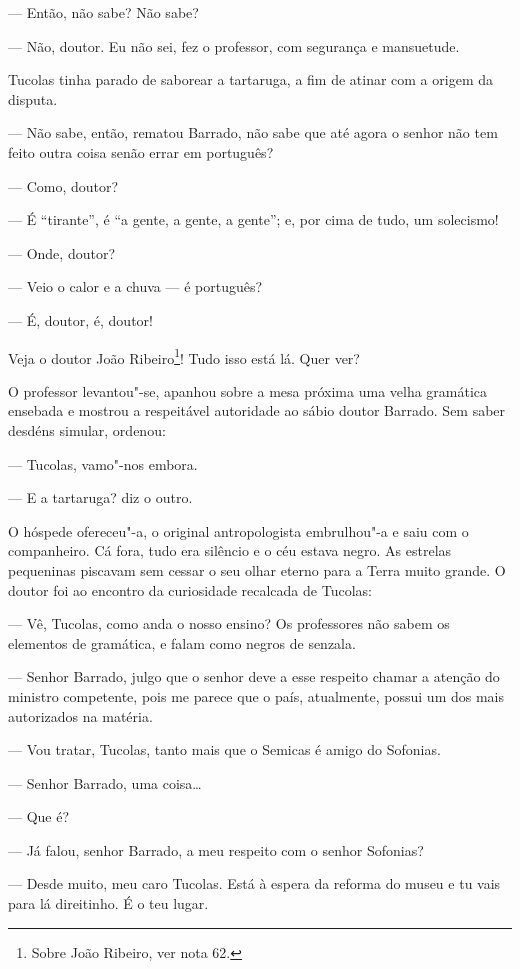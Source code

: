 --- Então, não sabe? Não sabe?

--- Não, doutor. Eu não sei, fez o professor, com segurança e
mansuetude.

Tucolas tinha parado de saborear a tartaruga, a fim de atinar com a
origem da disputa.

--- Não sabe, então, rematou Barrado, não sabe que até agora o senhor
não tem feito outra coisa senão errar em português?

--- Como, doutor?

--- É ``tirante'', é ``a gente, a gente, a gente''; e, por cima de tudo,
um solecismo!

--- Onde, doutor?

--- Veio o calor e a chuva --- é português?

--- É, doutor, é, doutor!

Veja o doutor João Ribeiro\footnote{Sobre João Ribeiro, ver nota 62.}!
Tudo isso está lá. Quer ver?

O professor levantou"-se, apanhou sobre a mesa próxima uma velha
gramática ensebada e mostrou a respeitável autoridade ao sábio doutor
Barrado. Sem saber desdéns simular, ordenou:

--- Tucolas, vamo"-nos embora.

--- E a tartaruga? diz o outro.

O hóspede ofereceu"-a, o original antropologista embrulhou"-a e saiu com o
companheiro. Cá fora, tudo era silêncio e o céu estava negro. As
estrelas pequeninas piscavam sem cessar o seu olhar eterno para a Terra
muito grande. O doutor foi ao encontro da curiosidade recalcada de
Tucolas:

--- Vê, Tucolas, como anda o nosso ensino? Os professores não sabem os
elementos de gramática, e falam como negros de senzala.

--- Senhor Barrado, julgo que o senhor deve a esse respeito chamar a
atenção do ministro competente, pois me parece que o país, atualmente,
possui um dos mais autorizados na matéria.

--- Vou tratar, Tucolas, tanto mais que o Semicas é amigo do Sofonias.

--- Senhor Barrado, uma coisa\ldots{}

--- Que é?

--- Já falou, senhor Barrado, a meu respeito com o senhor Sofonias?

--- Desde muito, meu caro Tucolas. Está à espera da reforma do museu e
tu vais para lá direitinho. É o teu lugar.

